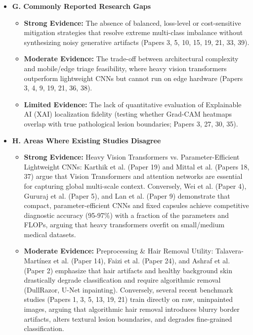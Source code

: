 \documentclass[11pt,a4paper]{article}
\begin{document}
\begin{itemize}
\begin{itemize}
  \item \textbf{Moderate Evidence:} High computational overhead, extensive parameter counts, and inference latency preventing real-time mobile edge deployment (Papers 4, 9, 11, 18, 19, 21, 36, 38); and vulnerability to dermoscopic artifacts (hair, ruler markings, vignetting, air bubbles; Papers 2, 14, 24, 27, 34).
  \item \textbf{Limited Evidence:} Saliency map unfaithfulness and lack of correlation with clinical diagnostic criteria (ABCD checklist; Papers 3, 27, 30, 35).
\end{itemize}
\item \textbf{G. Commonly Reported Research Gaps}
\begin{itemize}
  \item \textbf{Strong Evidence:} The absence of balanced, loss-level or cost-sensitive mitigation strategies that resolve extreme multi-class imbalance without synthesizing noisy generative artifacts (Papers 3, 5, 10, 15, 19, 21, 33, 39).
  \item \textbf{Moderate Evidence:} The trade-off between architectural complexity and mobile/edge triage feasibility, where heavy vision transformers outperform lightweight CNNs but cannot run on edge hardware (Papers 3, 4, 9, 19, 21, 36, 38).
  \item \textbf{Limited Evidence:} The lack of quantitative evaluation of Explainable AI (XAI) localization fidelity (testing whether Grad-CAM heatmaps overlap with true pathological lesion boundaries; Papers 3, 27, 30, 35).
\end{itemize}
\item \textbf{H. Areas Where Existing Studies Disagree}
\begin{itemize}
  \item \textbf{Strong Evidence:} Heavy Vision Transformers vs. Parameter-Efficient Lightweight CNNs: Karthik et al. (Paper 19) and Mittal et al. (Papers 18, 37) argue that Vision Transformers and attention networks are essential for capturing global multi-scale context. Conversely, Wei et al. (Paper 4), Gururaj et al. (Paper 5), and Lan et al. (Paper 9) demonstrate that compact, parameter-efficient CNNs and fixed capsules achieve competitive diagnostic accuracy (95-97\%) with a fraction of the parameters and FLOPs, arguing that heavy transformers overfit on small/medium medical datasets.
  \item \textbf{Moderate Evidence:} Preprocessing \& Hair Removal Utility: Talavera-Martínez et al. (Paper 14), Faizi et al. (Paper 24), and Ashraf et al. (Paper 2) emphasize that hair artifacts and healthy background skin drastically degrade classification and require algorithmic removal (DullRazor, U-Net inpainting). Conversely, several recent benchmark studies (Papers 1, 3, 5, 13, 19, 21) train directly on raw, uninpainted images, arguing that algorithmic hair removal introduces blurry border artifacts, alters textural lesion boundaries, and degrades fine-grained classification.

\end{itemize}
\end{itemize}
\end{document}
